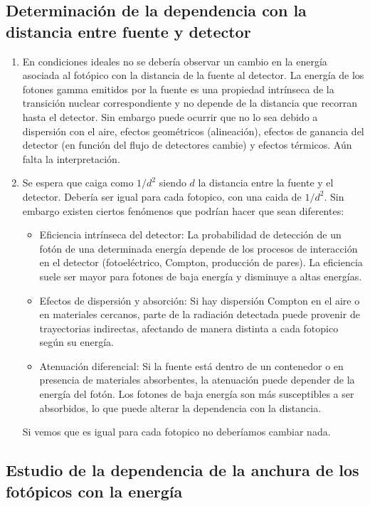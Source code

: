 \documentclass[11pt]{article}
\begin{document}
\subsection{Determinación de la dependencia con la distancia entre fuente y detector}

\begin{enumerate}[label=\alph*)]
    \item En condiciones ideales no se debería observar un cambio en la energía asociada al fotópico con la distancia de la fuente al detector. La energía de los fotones gamma emitidos por la fuente es una propiedad intrínseca de la transición nuclear correspondiente y no depende de la distancia que recorran hasta el detector. Sin embargo puede ocurrir que no lo sea debido a dispersión con el aire, efectos geométricos (alineación), efectos de ganancia del detector (en función del flujo de detectores cambie) y efectos térmicos. \textcolor{BrickRed}{Aún falta la interpretación.}
    \item Se espera que caiga como $1/d^2$ siendo $d$ la distancia entre la fuente y el detector. Debería ser igual para cada fotopico, con una caida de $1/d^2$. Sin embargo existen ciertos fenómenos que podrían hacer que sean diferentes: 
    \begin{itemize}
        \item Eficiencia intrínseca del detector: La probabilidad de detección de un fotón de una determinada energía depende de los procesos de interacción en el detector (fotoeléctrico, Compton, producción de pares). La eficiencia suele ser mayor para fotones de baja energía y disminuye a altas energías.
        \item Efectos de dispersión y absorción: Si hay dispersión Compton en el aire o en materiales cercanos, parte de la radiación detectada puede provenir de trayectorias indirectas, afectando de manera distinta a cada fotopico según su energía. 
        \item Atenuación diferencial: Si la fuente está dentro de un contenedor o en presencia de materiales absorbentes, la atenuación puede depender de la energía del fotón. Los fotones de baja energía son más susceptibles a ser absorbidos, lo que puede alterar la dependencia con la distancia.
    \end{itemize}
    \textcolor{BrickRed}{Si vemos que es igual para cada fotopico no deberíamos cambiar nada.}
\end{enumerate}

\subsection{Estudio de la dependencia de la anchura de los fotópicos con la energía}
\end{document}
